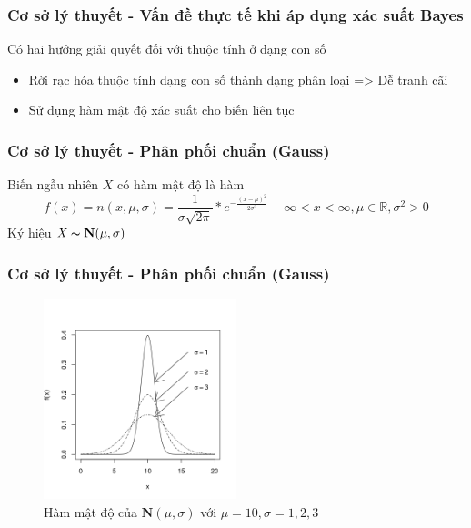 \documentclass[t]{beamer}
\begin{document}

\begin{frame}[t]
\frametitle{Cơ sở lý thuyết - Vấn đề thực tế khi áp dụng xác suất Bayes}
Có hai hướng giải quyết đối với thuộc tính ở dạng con số
\begin{itemize}
\item Rời rạc hóa thuộc tính dạng con số thành dạng phân loại => Dễ tranh cãi
\item Sử dụng hàm mật độ xác suất cho biến liên tục
\end{itemize}
\end{frame}


\begin{frame}[t]
\frametitle{Cơ sở lý thuyết - Phân phối chuẩn (Gauss)}
Biến ngẫu nhiên $\mathit{X}$ có hàm mật độ là hàm
\[
f(x)=n(x,\mu,\sigma)=\frac{1}{\sigma\sqrt{2\pi}} * e^{-\frac{(x-\mu)^2}{2\sigma^2}} -\infty < x < \infty, \mu \in \mathbb{R}, \sigma^2 > 0
\]
Ký hiệu $\mathit{X} \thicksim \textbf{N}(\mu,\sigma)$\\
\end{frame}


\begin{frame}[t]
\frametitle{Cơ sở lý thuyết - Phân phối chuẩn (Gauss)}
\begin{figure}[h]
  \centering
    \includegraphics[width=0.5\textwidth]{Normal_Distribution_PDF.png}   
    \caption*{Hàm mật độ của $\textbf{N}(\mu,\sigma)$ với $\mu=10, \sigma=1,2,3$} 
\end{figure}
\end{frame}

\end{document}
